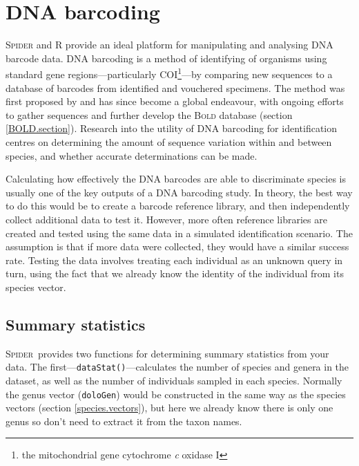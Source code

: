 \documentclass{article}
\newcommand{\spider}{\textsc{Spider}~} %
\newcommand{\progname}[1]{\textsc{#1}}
\newcommand{\fun}[1]{\texttt{#1}}
\begin{document}



\section{DNA barcoding}
\progname{Spider} and R provide an ideal platform for manipulating and analysing DNA barcode data. DNA barcoding is a method of identifying of organisms using standard gene regions---particularly COI\footnote{the mitochondrial gene cytochrome \emph{c} oxidase I}---by comparing new sequences to a database of barcodes from identified and vouchered specimens. The method was first proposed by \citet{Her.etal.2003.barcoding} and has since become a global endeavour, with ongoing efforts to gather sequences and further develop the \progname{Bold} database (section \ref{BOLD.section}). Research into the utility of DNA barcoding for identification centres on determining the amount of sequence variation within and between species, and whether accurate determinations can be made. 

Calculating how effectively the DNA barcodes are able to discriminate species is usually one of the key outputs of a DNA barcoding study. In theory, the best way to do this would be to create a barcode reference library, and then independently collect additional data to test it. However, more often reference libraries are created and tested using the same data in a simulated identification scenario. The assumption is that if more data were collected, they would have a similar success rate. Testing the data involves treating each individual as an unknown query in turn, using the fact that we already know the identity of the individual from its species vector. 


\subsection{Summary statistics}
\spider provides two functions for determining summary statistics from your data. The first---\fun{dataStat()}---calculates the number of species and genera in the dataset, as well as the number of individuals sampled in each species. Normally the genus vector (\fun{doloGen}) would be constructed in the same way as the species vectors (section \ref{species.vectors}), but here we already know there is only one genus so don't need to extract it from the taxon names.
\end{document}
